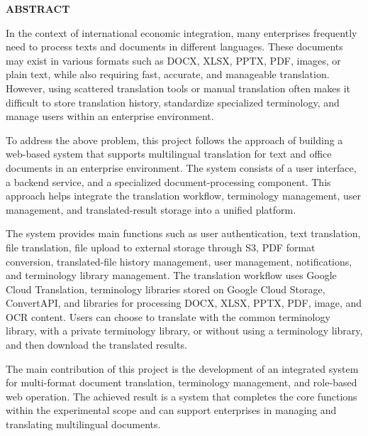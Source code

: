 \documentclass[../DoAn.tex]{subfiles}
\begin{document}
\begin{center}
    \Large{\textbf{ABSTRACT}}\\
\end{center}
\vspace{1cm}
In the context of international economic integration, many enterprises frequently need to process texts and documents in different languages. These documents may exist in various formats such as DOCX, XLSX, PPTX, PDF, images, or plain text, while also requiring fast, accurate, and manageable translation. However, using scattered translation tools or manual translation often makes it difficult to store translation history, standardize specialized terminology, and manage users within an enterprise environment.

To address the above problem, this project follows the approach of building a web-based system that supports multilingual translation for text and office documents in an enterprise environment. The system consists of a user interface, a backend service, and a specialized document-processing component. This approach helps integrate the translation workflow, terminology management, user management, and translated-result storage into a unified platform.

The system provides main functions such as user authentication, text translation, file translation, file upload to external storage through S3, PDF format conversion, translated-file history management, user management, notifications, and terminology library management. The translation workflow uses Google Cloud Translation, terminology libraries stored on Google Cloud Storage, ConvertAPI, and libraries for processing DOCX, XLSX, PPTX, PDF, image, and OCR content. Users can choose to translate with the common terminology library, with a private terminology library, or without using a terminology library, and then download the translated results.

The main contribution of this project is the development of an integrated system for multi-format document translation, terminology management, and role-based web operation. The achieved result is a system that completes the core functions within the experimental scope and can support enterprises in managing and translating multilingual documents.
\end{document}
